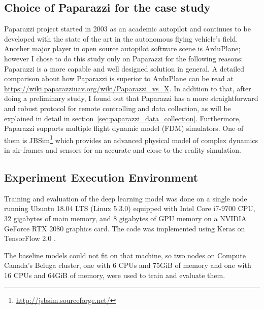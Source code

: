 \subsection{Choice of Paparazzi for the case study}
Paparazzi \cite{hattenberger2014using} project started in 2003 as an academic autopilot and continues to be developed with the state of the art in the autonomous flying vehicle's field. Another major player in open source autopilot software scene is ArduPlane; however I chose to do this study only on Paparazzi for the following reasons:
Paparazzi is a more capable and well designed solution in general. A detailed comparison about how Paparazzi is superior to ArduPlane can be read at \url{https://wiki.paparazziuav.org/wiki/Paparazzi_vs_X}. 
In addition to that, after doing a preliminary study, I found out that Paparazzi has a more straightforward and robust protocol for remote controlling and data collection, as will be explained in detail in section~\ref{sec:paparazzi_data_collection}. 
Furthermore, Paparazzi supports multiple flight dynamic model (FDM) simulators. One of them is JBSim\footnote{\url{http://jsbsim.sourceforge.net/}} which provides an advanced physical model of complex dynamics in air-frames and sensors for an accurate and close to the reality simulation. 


\subsection{Experiment Execution Environment} \label{sec:machines_config}
Training and evaluation of the deep learning model was done on a single node running Ubuntu 18.04 LTS (Linux 5.3.0) equipped with Intel Core i7-9700 CPU, 32 gigabytes of main memory, and 8 gigabytes of GPU memory on a NVIDIA GeForce RTX 2080 graphics card.
The code was implemented using Keras on TensorFlow 2.0 \cite{tensorflow2015-whitepaper}.

The baseline models could not fit on that machine, so two nodes on Compute Canada's Beluga cluster, one with 6 CPUs and 75GiB of memory and one with 16 CPUs and 64GiB of memory, were used to train and evaluate them.
